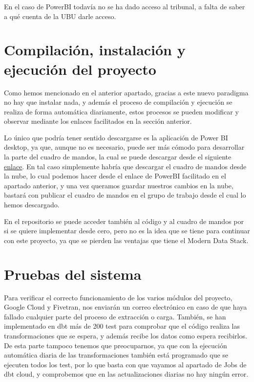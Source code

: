 En el caso de PowerBI todavía no se ha dado acceso al tribunal, a falta de saber a qué cuenta de la UBU darle acceso.

\section{Compilación, instalación y ejecución del proyecto}

Como hemos mencionado en el anterior apartado, gracias a este nuevo paradigma no hay que instalar nada, y además el proceso de compilación y ejecución se realiza de forma automática diariamente, estos procesos se pueden modificar y observar mediante los enlaces facilitados en la sección anterior. 

Lo único que podría tener sentido descargarse es la aplicación de Power BI desktop, ya que, aunque no es necesario, puede ser más cómodo para desarrollar la parte del cuadro de mandos, la cual se puede descargar desde el siguiente \href{https://powerbi.microsoft.com/es-es/downloads/}{enlace}. En tal caso simplemente habría que descargar el cuadro de mandos desde la nube, lo cual podemos hacer desde el enlace de PowerBI facilitado en el apartado anterior, y una vez queramos guardar nuestros cambios en la nube, bastará con publicar el cuadro de mandos en el grupo de trabajo desde el cual lo hemos descargado.

En el repositorio se puede acceder también al código y al cuadro de mandos por si se quiere implementar desde cero, pero no es la idea que se tiene para continuar con este proyecto, ya que se pierden las ventajas que tiene el Modern Data Stack.

\section{Pruebas del sistema}

Para verificar el correcto funcionamiento de los varios módulos del proyecto, Google Cloud y Fivetran, nos enviarán un correo electrónico en caso de que haya fallado cualquier parte del proceso de extracción o carga. También, se han implementado en dbt más de 200 test para comprobar que el código realiza las transformaciones que se espera, y además recibe los datos como espera recibirlos. De esta parte tampoco tenemos que preocuparnos, ya que con la ejecución automática diaria de las transformaciones también está programado que se ejecuten todos los test, por lo que basta con que vayamos al apartado de Jobs de dbt cloud, y comprobemos que en las actualizaciones diarias no hay ningún error.
